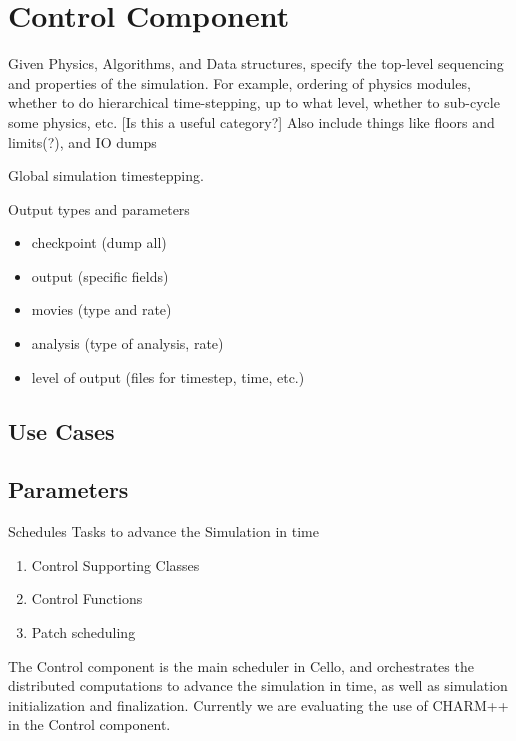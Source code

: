 \section{Control Component} \label{s:component-control}

Given Physics, Algorithms, and Data structures, specify the top-level
sequencing and properties of the simulation.  For example, ordering of
physics modules, whether to do hierarchical time-stepping, up to what
level, whether to sub-cycle some physics, etc. [Is this a useful
category?]  Also include things like floors and limits(?), and IO
dumps

Global simulation timestepping.

Output types and parameters

\begin{itemize}
\item checkpoint (dump all)
\item output (specific fields)
\item movies (type and rate)
\item analysis (type of analysis, rate)
\item level of output (files for timestep, time, etc.)
\end{itemize}

\subsection{Use Cases}
\subsection{Parameters}

Schedules Tasks to advance the Simulation in time 
\begin{enumerate}
\item Control Supporting Classes
\item Control Functions
\item Patch scheduling
\end{enumerate}

The Control component is the main scheduler in Cello, and orchestrates
the distributed computations to advance the simulation in time, as
well as simulation initialization and finalization.  Currently we are
evaluating the use of CHARM++ in the Control component.

